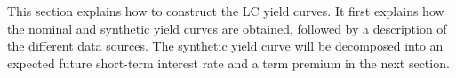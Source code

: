 This section explains how to construct the LC yield curves. It first explains how the nominal and synthetic yield curves are obtained, followed by a description of the different data sources. 
The synthetic yield curve will be decomposed into an expected future short-term interest rate and a term premium in the next section. 

